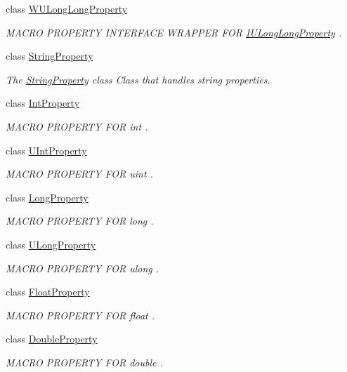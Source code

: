 \begin{DoxyCompactItemize}
class \hyperlink{class_w_u_long_long_property}{W\-U\-Long\-Long\-Property}
\begin{DoxyCompactList}\small\item\em M\-A\-C\-R\-O P\-R\-O\-P\-E\-R\-T\-Y I\-N\-T\-E\-R\-F\-A\-C\-E W\-R\-A\-P\-P\-E\-R F\-O\-R \hyperlink{class_i_u_long_long_property}{I\-U\-Long\-Long\-Property} . \end{DoxyCompactList}\item 
class \hyperlink{class_string_property}{String\-Property}
\begin{DoxyCompactList}\small\item\em The \hyperlink{class_string_property}{String\-Property} class Class that handles string properties. \end{DoxyCompactList}\item 
class \hyperlink{class_int_property}{Int\-Property}
\begin{DoxyCompactList}\small\item\em M\-A\-C\-R\-O P\-R\-O\-P\-E\-R\-T\-Y F\-O\-R int . \end{DoxyCompactList}\item 
class \hyperlink{class_u_int_property}{U\-Int\-Property}
\begin{DoxyCompactList}\small\item\em M\-A\-C\-R\-O P\-R\-O\-P\-E\-R\-T\-Y F\-O\-R uint . \end{DoxyCompactList}\item 
class \hyperlink{class_long_property}{Long\-Property}
\begin{DoxyCompactList}\small\item\em M\-A\-C\-R\-O P\-R\-O\-P\-E\-R\-T\-Y F\-O\-R long . \end{DoxyCompactList}\item 
class \hyperlink{class_u_long_property}{U\-Long\-Property}
\begin{DoxyCompactList}\small\item\em M\-A\-C\-R\-O P\-R\-O\-P\-E\-R\-T\-Y F\-O\-R ulong . \end{DoxyCompactList}\item 
class \hyperlink{class_float_property}{Float\-Property}
\begin{DoxyCompactList}\small\item\em M\-A\-C\-R\-O P\-R\-O\-P\-E\-R\-T\-Y F\-O\-R float . \end{DoxyCompactList}\item 
class \hyperlink{class_double_property}{Double\-Property}
\begin{DoxyCompactList}\small\item\em M\-A\-C\-R\-O P\-R\-O\-P\-E\-R\-T\-Y F\-O\-R double . \end{DoxyCompactList}\item 

\end{DoxyCompactItemize}
